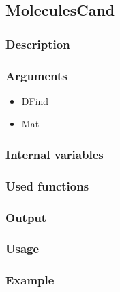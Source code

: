 \subsection{MoleculesCand}
\subsubsection{Description}
\subsubsection{Arguments}

\begin{itemize}
\item DFind
\item Mat
\end{itemize}
\subsubsection{Internal variables}
\subsubsection{Used functions}
\subsubsection{Output}
\subsubsection{Usage}
\subsubsection{Example}

